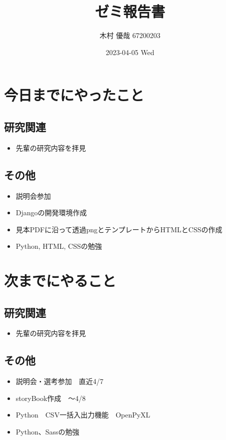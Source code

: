 \documentclass[uplatex, onecolumn, 10pt]{jsarticle}
\begin{document}
\title{\vspace{-40mm}\bf{\LARGE{ゼミ報告書}}}
\author{\vspace{-40mm}木村 優哉 67200203}
\date{2023-04-05 Wed}
\maketitle


\section{今日までにやったこと}

\subsection*{研究関連}
\begin{itemize}
	\item 先輩の研究内容を拝見
\end{itemize}

\subsection*{その他}
\begin{itemize}
	\item 説明会参加
	\item Djangoの開発環境作成
	\item 見本PDFに沿って透過pngとテンプレートからHTMLとCSSの作成
	\item Python, HTML, CSSの勉強
\end{itemize}


\section{次までにやること}

\subsection*{研究関連}
\begin{itemize}
	\item 先輩の研究内容を拝見
\end{itemize}

\subsection*{その他}
\begin{itemize}
	\item 説明会・選考参加　直近4/7
	\item storyBook作成　～4/8
	\item Python　CSV一括入出力機能　OpenPyXL
	\item Python、Sassの勉強
\end{itemize}
\end{document}
